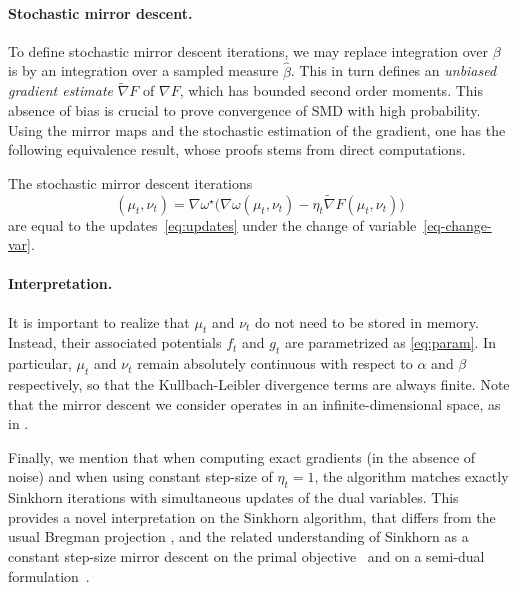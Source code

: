 \paragraph{Stochastic mirror descent.}

To define stochastic mirror descent iterations, we may replace integration over $\beta$ is by an integration over a sampled measure $\hat \beta$. This in turn defines an \textit{unbiased gradient estimate} $\tilde \nabla F$ of $\nabla F$, which has bounded second order moments.
%
This absence of bias is crucial to prove convergence of SMD with high
probability. Using the mirror maps and the stochastic estimation of the
gradient, one has the following equivalence result, whose proofs stems from
direct computations. 

\begin{proposition}
The stochastic mirror descent iterations
\begin{equation}
    (\mu_t, \nu_t) = \nabla \omega^\star\Big( \nabla \omega(\mu_t, \nu_t) - 
    \eta_t \tilde \nabla F(\mu_t, \nu_t)\Big)
\end{equation}
are equal to the updates~\eqref{eq:updates} under the change of variable~\eqref{eq-change-var}.
\end{proposition}

\paragraph{Interpretation.} 

It is important to realize that $\mu_t$ and $\nu_t$ do not need to be stored in memory. Instead,
their associated potentials $f_t$ and $g_t$ are parametrized as
\eqref{eq:param}. In particular, $\mu_t$ and $\nu_t$ remain absolutely
continuous with respect to $\alpha$ and $\beta$ respectively, so that the
Kullbach-Leibler divergence terms are always finite. Note that the mirror descent
we consider operates in an infinite-dimensional space, as in \citet{hsieh2018finding}.

Finally, we mention that  when computing exact gradients (in the absence of noise) and when using constant step-size of
$\eta_t=1$, the algorithm matches exactly Sinkhorn iterations with simultaneous updates of the dual variables. This provides a novel interpretation on the Sinkhorn algorithm, that differs from the usual Bregman projection \citep{benamou2015iterative}, and the related understanding of Sinkhorn as a constant step-size mirror descent on the primal objective~\citep{mishchenko2019sinkhorn} and on a semi-dual formulation~\citep{leger2019sinkhorn}. 


